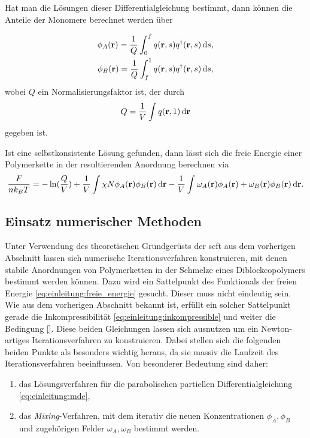 Hat man die Lösungen dieser Differentialgleichung bestimmt, dann können die Anteile der Monomere berechnet werden über

\begin{equation}
    \begin{aligned}
        \phi_{A}(\mathbf{r}) = \frac{1}{Q} \int_{0}^{f} q(\mathbf{r}, s) q^{\dagger}(\mathbf{r}, s) \mathop{}\!\mathrm{d} s,\\
        \phi_{B}(\mathbf{r}) = \frac{1}{Q} \int_{f}^{1} q(\mathbf{r}, s) q^{\dagger}(\mathbf{r}, s) \mathop{}\!\mathrm{d} s,
    \end{aligned}
\end{equation}
wobei $Q$ ein Normalisierungsfaktor ist, der durch
\begin{equation}
    Q = \frac{1}{V} \int q(\mathbf{r}, 1) \mathop{}\!\mathrm{d} \mathbf{r}
\end{equation}
gegeben ist.

Ist eine selbstkonsistente Lösung gefunden, dann lässt sich die freie Energie einer Polymerkette in der resultierenden Anordnung berechnen via
\begin{equation}
\label{eq:einleitung:freie_energie}
    \frac{F}{n k_{B} T} = - \ln(\frac{Q}{V}) + \frac{1}{V} \int \chi N \phi_{A}(\mathbf{r}) \phi_{B}(\mathbf{r}) \mathop{}\!\mathrm{d} \mathbf{r} - \frac{1}{V} \int \omega_{A}(\mathbf{r}) \phi_{A}(\mathbf{r}) + \omega_{B}(\mathbf{r}) \phi_{B}(\mathbf{r}) \mathop{}\!\mathrm{d} \mathbf{r}.
\end{equation}

\subsection*{Einsatz numerischer Methoden} %

Unter Verwendung des theoretischen Grundgerüsts der \ac{scft} aus dem vorherigen Abschnitt lassen sich numerische Iterationsverfahren konstruieren, mit denen stabile Anordnungen von Polymerketten in der Schmelze eines Diblockcopolymers bestimmt werden können.
Dazu wird ein Sattelpunkt des Funktionals der freien Energie \eqref{eq:einleitung:freie_energie} gesucht.
Dieser muss nicht eindeutig sein.
Wie aus dem vorherigen Abschnitt bekannt ist, erfüllt ein solcher Sattelpunkt gerade die Inkompressibilität \eqref{eq:einleitung:inkompressible} und weiter die Bedingung \eqref{}.
Diese beiden Gleichungen lassen sich ausnutzen um ein Newton-artiges Iterationsverfahren zu konstruieren.
Dabei stellen sich die folgenden beiden Punkte als besonders wichtig heraus, da sie massiv die Laufzeit des Iterationsverfahren beeinflussen.
Von besonderer Bedeutung sind daher:
\begin{enumerate}
    \item das Lösungsverfahren für die parabolischen partiellen Differentialgleichung \eqref{eq:einleitung:mde},
    \item das \emph{Mixing}-Verfahren, mit dem iterativ die neuen Konzentrationen $\phi_{A}, \phi_{B}$ und zugehörigen Felder $\omega_{A}, \omega_{B}$ bestimmt werden.
\end{enumerate}

